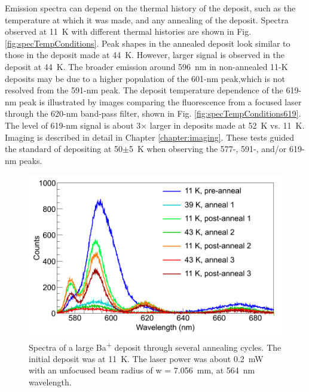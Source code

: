 Emission spectra can depend on the thermal history of the deposit, such as the temperature at which it was made, and any annealing of the deposit.  Spectra observed at 11~K with different thermal histories are shown in Fig. \ref{fig:specTempConditions}.  Peak shapes in the annealed deposit look similar to those in the deposit made at 44~K.  However, larger signal is observed in the deposit at 44~K.  The broader emission around 596~nm in non-annealed 11-K deposits may be due to a higher population of the 601-nm peak,which is not resolved from the 591-nm peak.  The deposit temperature dependence of the 619-nm peak is illustrated by images comparing the fluorescence from a focused laser through the 620-nm band-pass filter, shown in Fig. \ref{fig:specTempConditions619}.  The level of 619-nm signal is about 3$\times$ larger in deposits made at 52~K vs. 11~K.  Imaging is described in detail in Chapter \ref{chapter:imaging}.  These tests guided the standard of depositing at 50$\pm$5~K when observing the 577-, 591-, and/or 619-nm peaks.







\begin{figure} %
        \centering
                \includegraphics[width=.7\textwidth]{figures/spectra_annealing.png}
                \caption{Spectra of a large Ba\textsuperscript{+} deposit through several annealing cycles.  The initial deposit was at 11~K.  The laser power was about 0.2~mW with an unfocused beam radius of w = 7.056~mm, at 564~nm wavelength.  \cite{Mong2015}}
\label{fig:specAnneal}
\end{figure}

